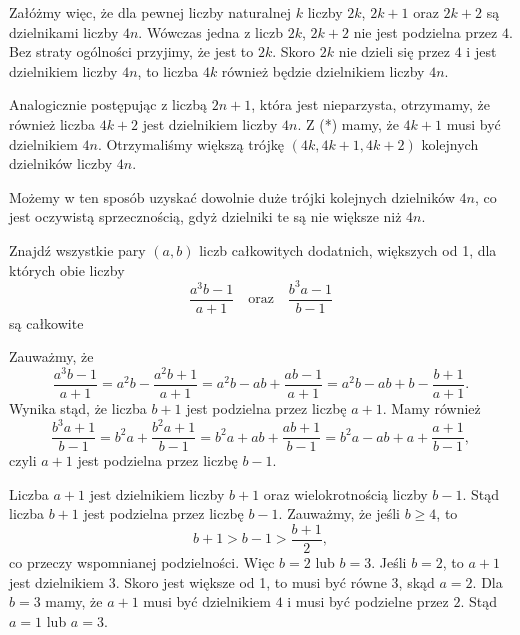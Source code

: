 \vspace{10px}

\noindent
Załóżmy więc, że dla pewnej liczby naturalnej $k$ liczby $2k$, $2k + 1$ oraz $2k + 2$ są dzielnikami liczby $4n$. Wówczas jedna z liczb $2k$, $2k + 2$ nie jest podzielna przez $4$. Bez straty ogólności przyjimy, że jest to $2k$. Skoro $2k$ nie dzieli się przez $4$ i jest dzielnikiem liczby $4n$, to liczba $4k$ również będzie dzielnikiem liczby $4n$. 

Analogicznie postępując z liczbą $2n + 1$, która jest nieparzysta, otrzymamy, że również liczba $4k + 2$ jest dzielnikiem liczby $4n$. Z (*) mamy, że $4k + 1$ musi być dzielnikiem $4n$. Otrzymaliśmy większą trójkę $(4k, 4k + 1, 4k + 2)$ kolejnych dzielników liczby $4n$.

\vspace{10px}

\noindent
Możemy w ten sposób uzyskać dowolnie duże trójki kolejnych dzielników $4n$, co jest oczywistą sprzecznością, gdyż dzielniki te są nie większe niż $4n$.

\vspace{10px}

\begin{problem}{4}
	Znajdź wszystkie pary $(a, b)$ liczb całkowitych dodatnich, większych od 1, dla których obie liczby
	\[
		\frac{a^3b - 1}{a + 1} \quad \text{oraz} \quad \frac{b^3a - 1}{b - 1}
	\]
	są całkowite
\end{problem}


\noindent
Zauważmy, że 
\[
	\frac{a^3b - 1}{a + 1} = a^2b - \frac{a^2b + 1}{a + 1} = a^2b - ab + \frac{ab - 1}{a + 1} = a^2b - ab + b - \frac{b + 1}{a + 1}.
\]
Wynika stąd, że liczba $b + 1$ jest podzielna przez liczbę $a + 1$. Mamy również
\[
	\frac{b^3a + 1}{b - 1} = b^2a + \frac{b^2a + 1}{b - 1} = b^2a + ab + \frac{ab + 1}{b - 1} = b^2a - ab + a + \frac{a + 1}{b - 1},
\]
czyli $a + 1$ jest podzielna przez liczbę $b - 1$. 

\vspace{10px}

\noindent
Liczba $a + 1$ jest dzielnikiem liczby $b + 1$ oraz wielokrotnością liczby $b - 1$. Stąd liczba $b + 1$ jest podzielna przez liczbę $b - 1$. Zauważmy, że jeśli $b \geqslant 4$, to
\[
	b + 1 > b - 1 > \frac{b + 1}{2},
\]
co przeczy wspomnianej podzielności.
Więc $b = 2$ lub $b = 3$. Jeśli $b = 2$, to $a + 1$ jest dzielnikiem $3$. Skoro jest większe od 1, to musi być równe 3, skąd $a = 2$. Dla $b = 3$ mamy, że $a + 1$ musi być dzielnikiem $4$ i musi być podzielne przez $2$. Stąd $a = 1$ lub $a = 3$. 

